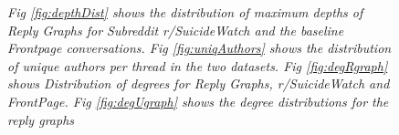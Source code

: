 \begin{figure}[!ht]
	\centering
    
    
\caption{\textsl{ Fig \ref{fig:depthDist} shows the distribution of maximum depths of Reply Graphs for Subreddit r/SuicideWatch and the baseline Frontpage conversations. Fig \ref{fig:uniqAuthors} shows the distribution of unique authors per thread in the two datasets. Fig \ref{fig:degRgraph} shows Distribution of degrees for Reply Graphs,  r/SuicideWatch and FrontPage. Fig \ref{fig:degUgraph} shows the degree distributions for the reply graphs}}
\end{figure}

